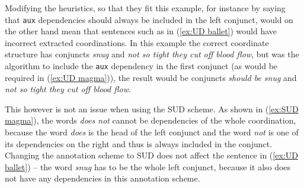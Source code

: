 Modifying the heuristics, so that they fit this example, for instance by saying that \texttt{aux} dependencies should always be included in the left conjunct, would on the other hand mean that sentences such as in (\ref{ex:UD ballet}) would have incorrect extracted coordinations. In this example the correct coordinate structure has conjuncts \textsl{snug} and \textsl{not so tight they cut off blood flow}, but was the algorithm to include the \texttt{aux} dependency in the first conjunct (as would be required in (\ref{ex:UD magma})), the result would be conjuncts \textsl{should be snug} and \textsl{not so tight they cut off blood flow}.

This however is not an issue when using the SUD scheme. As shown in (\ref{ex:SUD magma}), the words \textsl{does not} cannot be dependencies of the whole coordination, because the word \textsl{does} is the head of the left conjunct and the word \textsl{not} is one of its dependencies on the right and thus is always included in the conjunct. Changing the annotation scheme to SUD does not affect the sentence in (\ref{ex:UD ballet}) -- the word \textsl{snug} has to be the whole left conjunct, because it also does not have any dependencies in this annotation scheme.
